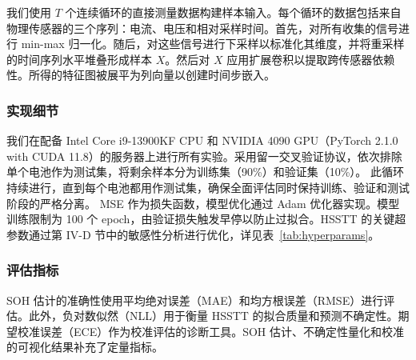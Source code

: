 \documentclass[UTF8,journal,twoside,web]{ieeecolor}
\newcommand{\newtext}[1]{{\leavevmode\color{blue}#1}}
\begin{document}
我们使用 $T$ 个连续循环的直接测量数据构建样本输入。每个循环的数据包括来自物理传感器的三个序列：电流、电压和相对采样时间。首先，对所有收集的信号进行 min-max 归一化。随后，对这些信号进行下采样以标准化其维度，并将重采样的时间序列水平堆叠形成样本 $X$。然后对 $X$ 应用扩展卷积以提取跨传感器依赖性。所得的特征图被展平为列向量以创建时间步嵌入。

\subsubsection{实现细节}\label{subsubsec:implementation_details}
我们在配备 Intel Core i9-13900KF CPU 和 NVIDIA 4090 GPU（PyTorch 2.1.0 with CUDA 11.8）的服务器上进行所有实验。采用留一交叉验证协议，依次排除单个电池作为测试集，将剩余样本分为训练集（90\%）和验证集（10\%）。
此循环持续进行，直到每个电池都用作测试集，确保全面评估同时保持训练、验证和测试阶段的严格分离。
MSE 作为损失函数，模型优化通过 Adam 优化器实现。模型训练限制为 100 个 epoch，由验证损失触发早停以防止过拟合。\newtext{HSSTT 的关键超参数通过第 IV-D 节中的敏感性分析进行优化，详见表~\ref{tab:hyperparams}。}

\subsubsection{评估指标}\label{metrics}
% 
SOH 估计的准确性使用平均绝对误差（MAE）和均方根误差（RMSE）进行评估。此外，负对数似然（NLL）用于衡量 HSSTT 的拟合质量和预测不确定性。期望校准误差（ECE）作为校准评估的诊断工具\cite{kuleshov2018accurate, nemani2023uncertainty}。SOH 估计、不确定性量化和校准的可视化结果补充了定量指标。
\end{document}
